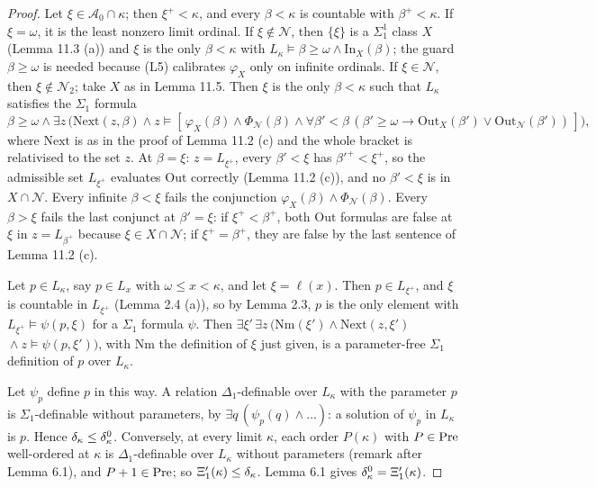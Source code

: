 \documentclass[11pt]{article}
\begin{document}
\begin{proof} Let $\xi \in \mathcal A_0 \cap \kappa$; then $\xi^+ < \kappa$, and every $\beta < \kappa$ is countable
with $\beta^+ < \kappa$. If $\xi = \omega$, it is the least nonzero limit ordinal. If $\xi \notin \mathcal N$, then
$\{\xi\}$ is a $\Sigma^1_1$ class $X$ (Lemma 11.3 (a)) and $\xi$ is the only $\beta < \kappa$ with
$L_{\kappa} \models \beta \ge \omega \wedge \mathrm{In}_X(\beta)$; the guard $\beta \ge \omega$ is needed because
(L5) calibrates $\varphi_X$ only on infinite ordinals. If $\xi \in \mathcal N$, then $\xi \notin \mathcal N_2$; take
$X$ as in Lemma 11.5. Then $\xi$ is the only $\beta < \kappa$ such that $L_{\kappa}$ satisfies the $\Sigma_1$ formula
\[ \beta \ge \omega \wedge \exists z\, \bigl(\mathrm{Next}(z, \beta) \wedge z \models [\,\varphi_X(\beta) \wedge
\Phi_{\mathcal N}(\beta) \wedge \forall \beta' < \beta\, (\beta' \ge \omega \to
\mathrm{Out}_X(\beta') \vee \mathrm{Out}_{\mathcal N}(\beta'))\,]\bigr) , \]
where $\mathrm{Next}$ is as in the proof of Lemma 11.2 (c) and the whole bracket is relativised to the set $z$.
At $\beta = \xi$: $z = L_{\xi^+}$, every $\beta' < \xi$ has $\beta'^+ < \xi^+$, so the admissible set $L_{\xi^+}$
evaluates $\mathrm{Out}$ correctly (Lemma 11.2 (c)), and no $\beta' < \xi$ is in $X \cap \mathcal N$. Every infinite
$\beta < \xi$ fails the conjunction $\varphi_X(\beta) \wedge \Phi_{\mathcal N}(\beta)$. Every $\beta > \xi$ fails the
last conjunct at $\beta' = \xi$: if $\xi^+ < \beta^+$, both $\mathrm{Out}$ formulas are false at $\xi$ in
$z = L_{\beta^+}$ because $\xi \in X \cap \mathcal N$; if $\xi^+ = \beta^+$, they are false by the last sentence of
Lemma 11.2 (c).

Let $p \in L_{\kappa}$, say $p \in L_x$ with $\omega \le x < \kappa$, and let $\xi = \ell(x)$. Then
$p \in L_{\xi^+}$, and $\xi$ is countable in $L_{\xi^+}$ (Lemma 2.4 (a)), so by Lemma 2.3, $p$ is the only element
with $L_{\xi^+} \models \psi(p, \xi)$ for a $\Sigma_1$ formula $\psi$. Then
$\exists \xi'\, \exists z\, (\mathrm{Nm}(\xi') \wedge \mathrm{Next}(z, \xi')$ ${}\wedge z \models \psi(p, \xi'))$, with
$\mathrm{Nm}$ the definition of $\xi$ just given, is a parameter-free $\Sigma_1$ definition of $p$ over $L_{\kappa}$.

Let $\psi_p$ define $p$ in this way. A relation $\Delta_1$-definable over $L_{\kappa}$ with the parameter $p$ is
$\Sigma_1$-definable without parameters, by $\exists q\, (\psi_p(q) \wedge \dots)$: a solution of $\psi_p$ in
$L_{\kappa}$ is $p$. Hence $\delta_{\kappa} \le \delta^0_{\kappa}$. Conversely, at every limit $\kappa$, each order
$P(\kappa)$ with $P \in \mathrm{Pre}$ well-ordered at $\kappa$ is $\Delta_1$-definable over $L_{\kappa}$ without parameters
(remark after Lemma 6.1), and $P + 1 \in \mathrm{Pre}$; so $\Xi'_1(\kappa) \le \delta_{\kappa}$. Lemma 6.1 gives
$\delta^0_{\kappa} = \Xi'_1(\kappa)$.
\end{proof}
\end{document}
